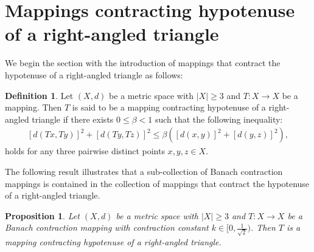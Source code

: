 \documentclass[11pt,reqno,a4paper]{amsart}
\theoremstyle{plain}
\newtheorem{proposition}[theorem]{Proposition}
\theoremstyle{definition}
\newtheorem{definition}[theorem]{Definition}
\theoremstyle{remark}
\numberwithin{equation}{section}
\begin{document}


 

\section{Mappings contracting hypotenuse of a right-angled triangle}
We begin the section with the introduction of mappings that contract the hypotenuse of a right-angled triangle as follows:
\begin{definition}\label{21}
Let $(X,d)$ be a metric space with $|X|\ge 3$ and $T:X \to X$ be a mapping. Then $T$ is said to be a mapping contracting hypotenuse of a right-angled triangle if there exists $0 \le \beta<1$ such that the following inequality:
\begin{align}\label{e21}
[d(Tx,Ty)]^2+[d(Ty,Tz)]^2\le \beta ([d(x,y)]^2+[d(y,z)]^2),
\end{align}
holds for any three pairwise distinct points $x,y,z \in X$.
\end{definition}
The following result illustrates that a sub-collection of Banach contraction mappings is contained in the collection of mappings that contract the hypotenuse of a right-angled triangle.

\begin{proposition}\label{22}
    Let $(X, d)$ be a metric space with $|X| \geq 3$ and $T:X \to X$ be a Banach contraction mapping with contraction constant $k \in [0, \frac{1}{\sqrt{2}})$. Then $T$ is a mapping contracting hypotenuse of a right-angled triangle.
\end{proposition}
\end{document}
